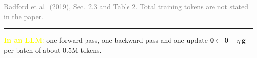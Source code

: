 \documentclass[12pt]{beamer}
\begin{document}
\begin{frame}
\begin{columns}[T]
    \end{columns}
    {\par\vspace{1mm}\footnotesize\textcolor{gray}
        {Radford et al.\ (2019), Sec.\ 2.3 and Table 2.
            Total training tokens are not stated in the paper.}\par}
    \vfill
    {\color{yellow}\rule{\linewidth}{0.5pt}}\par\vspace{1mm}
    {\raggedright\small\textcolor{yellow}{\textbf{In an LLM:}}
        one forward pass, one backward pass and one update
        $\symbf{\theta}\leftarrow\symbf{\theta}-\eta\,\symbf{g}$
        per batch of about $0.5$M tokens.\par}
\end{frame}
\end{document}
